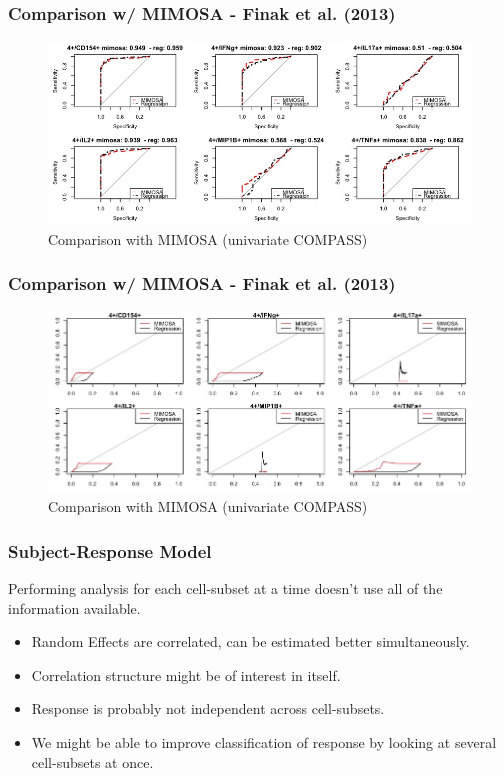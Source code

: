 \documentclass{beamer}
\theoremstyle{definition}
\begin{document}

\begin{frame}
\frametitle{Comparison w/ MIMOSA - Finak et al. (2013) }
\begin{figure}[]
\includegraphics[width=11 cm]{figures/mimosaComparisonROC} 
\caption{Comparison with MIMOSA (univariate COMPASS)}
\end{figure}
\end{frame}


\begin{frame}
\frametitle{Comparison w/ MIMOSA - Finak et al. (2013) }
\begin{figure}[]
\includegraphics[width=11 cm]{figures/mimosaComparisonFDR} 
\caption{Comparison with MIMOSA (univariate COMPASS)}
\end{figure}
\end{frame}


\begin{frame}
\frametitle{Subject-Response Model}
Performing analysis for each cell-subset at a time doesn't use all of the information available.
\pause
\vspace{0.3 cm} 
\begin{itemize}
\item Random Effects are correlated, can be estimated better simultaneously.
\vspace{0.3 cm}
\item Correlation structure might be of interest in itself. 
\pause
\vspace{0.3 cm}
\item Response is probably not independent across cell-subsets.
\vspace{0.3 cm}
\item We might be able to improve classification of response by looking at several cell-subsets at once.  
\end{itemize}
\end{frame}
\end{document}
